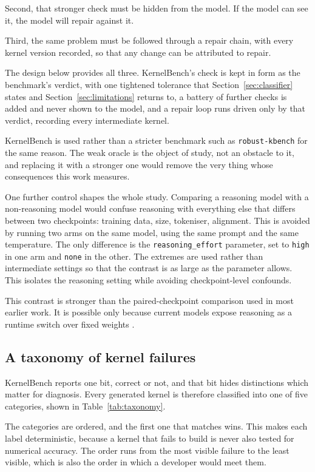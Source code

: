 \documentclass[12pt]{article}
\begin{document}
Second, that stronger check must be hidden from the model. If the model can see
it, the model will repair against it.

Third, the same problem must be followed through a repair chain, with every
kernel version recorded, so that any change can be attributed to repair.

The design below provides all three. KernelBench's check is kept in form as the
benchmark's verdict, with one tightened tolerance that Section~\ref{sec:classifier}
states and Section~\ref{sec:limitations} returns to, a battery of further checks is added and never shown to
the model, and a repair loop runs driven only by that verdict, recording every
intermediate kernel.

KernelBench is used rather than a stricter benchmark such as
\texttt{robust-kbench} \citep{lange2025robustkbench} for the same reason. The
weak oracle is the object of study, not an obstacle to it, and replacing it
with a stronger one would remove the very thing whose consequences this work
measures.

One further control shapes the whole study. Comparing a reasoning model with a
non-reasoning model would confuse reasoning with everything else that differs
between two checkpoints: training data, size, tokeniser, alignment. This is
avoided by running two arms on the same model, using the same prompt and the
same temperature. The only difference is the \texttt{reasoning\_effort}
parameter, set to \texttt{high} in one arm and \texttt{none} in the other. The
extremes are used rather than intermediate settings so that the contrast is as
large as the parameter allows. This isolates the reasoning setting while
avoiding checkpoint-level confounds.

This contrast is stronger than the paired-checkpoint comparison used in most
earlier work. It is possible only because current models expose reasoning as a
runtime switch over fixed weights \citep{qwen2025qwen3}.

\subsection{A taxonomy of kernel failures}
\label{sec:taxonomy}

KernelBench reports one bit, correct or not, and that bit hides distinctions
which matter for diagnosis. Every generated kernel is therefore classified into one
of five categories, shown in Table~\ref{tab:taxonomy}.

The categories are ordered, and the first one that matches wins. This makes
each label deterministic, because a kernel that fails to build is never also
tested for numerical accuracy. The order runs from the most visible failure to
the least visible, which is also the order in which a developer would meet
them.
\end{document}
